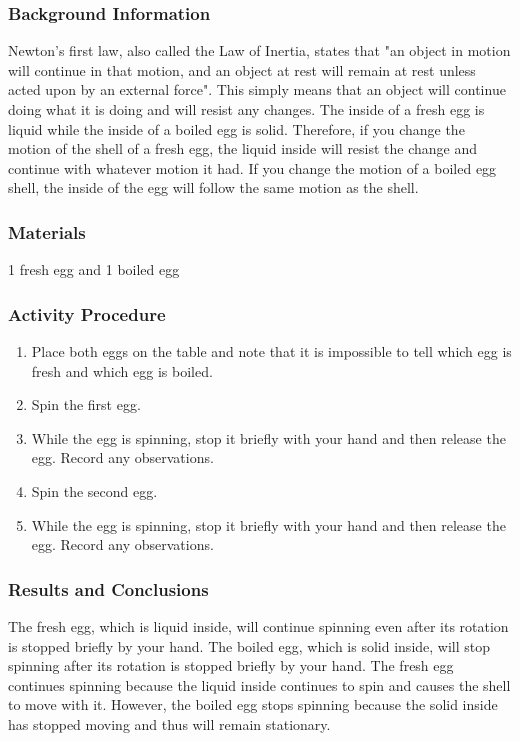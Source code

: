 \subsubsection*{Background Information}
Newton's first law, also called the Law of Inertia, states that "an object in motion will continue in that motion, and an object at rest will remain at rest unless acted upon by an external force". This simply means that an object will continue doing what it is doing and will resist any changes.  
The inside of a fresh egg is liquid while the inside of a boiled egg is solid. Therefore, if you change the motion of the shell of a fresh egg, the liquid inside will resist the change and continue with whatever motion it had. If you change the motion of a boiled egg shell, the inside of the egg will follow the same motion as the shell.  

\subsubsection*{Materials}
1 fresh egg and 1 boiled egg

\subsubsection*{Activity Procedure}
\begin{enumerate}
\item{Place both eggs on the table and note that it is impossible to tell which egg is fresh and which egg is boiled.} 
\item{Spin the first egg.} 
\item{While the egg is spinning, stop it briefly with your hand and then release the egg.  Record any observations.} 
\item{Spin the second egg.} 
\item{While the egg is spinning, stop it briefly with your hand and then release the egg.  Record any observations.} 
\end{enumerate}

\subsubsection*{Results and Conclusions}
The fresh egg, which is liquid inside, will continue spinning even after its rotation is stopped briefly by your hand. The boiled egg, which is solid inside, will stop spinning after its rotation is stopped briefly by your hand.  
The fresh egg continues spinning because the liquid inside continues to spin and causes the shell to move with it. However, the boiled egg stops spinning because the solid inside has stopped moving and thus will remain stationary.  

